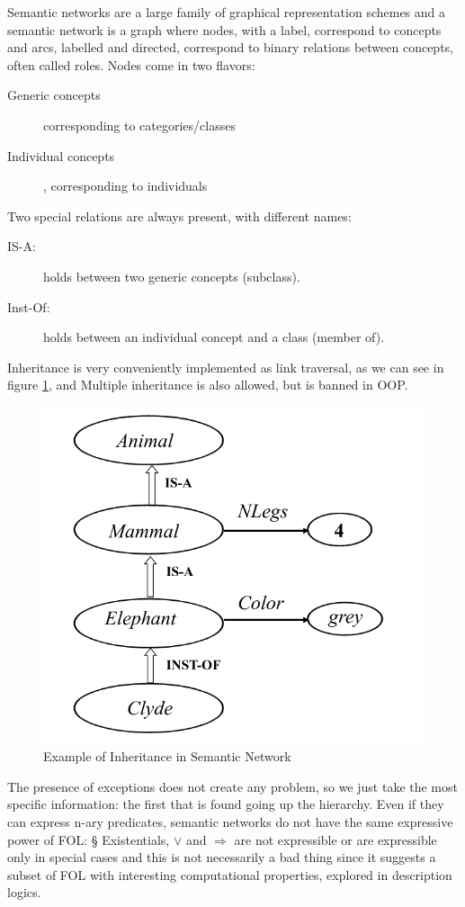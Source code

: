 Semantic networks are a large family of graphical representation schemes and 
a semantic network is a graph where nodes, with a label, correspond to concepts
and arcs, labelled and directed, correspond to binary relations
between concepts, often called roles.\newline
Nodes come in two flavors:
\begin{description}
   \item [Generic concepts] corresponding to categories/classes
   \item [Individual concepts], corresponding to individuals
\end{description}
Two special relations are always present, with different names:
\begin{description}
    \item [IS-A: ]    holds between two generic concepts (subclass).
    \item [Inst-Of: ] holds between an individual concept and a class (member of).
\end{description}
Inheritance is very conveniently implemented as link traversal, as we can see in figure 
\ref{img:inheritance}, and Multiple inheritance is also allowed, but is banned in OOP.

\begin{figure}
	\includegraphics[width=\textwidth]{Images/inheritanceExample}
	\caption{Example of Inheritance in Semantic Network}
	\label{img:inheritance}
\end{figure}
The presence of exceptions does not create any problem, so we just take the most
specific information: the first that is found going up the hierarchy.\newline
Even if they can express n-ary predicates, semantic networks do not have the same
expressive power of FOL:
§ Existentials, $\lor$ and $\Rightarrow$ are not expressible or are expressible
only in special cases and this is not necessarily a bad thing since it suggests
a subset of FOL with interesting computational properties, explored in description logics.

